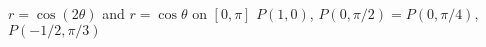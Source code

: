 {$r=\cos(2\theta)$ and $r=\cos\theta$ on $[0,\pi]$}
{$P(1,0)$, $P(0,\pi/2)=P(0,\pi/4)$, $P(-1/2,\pi/3)$
}
